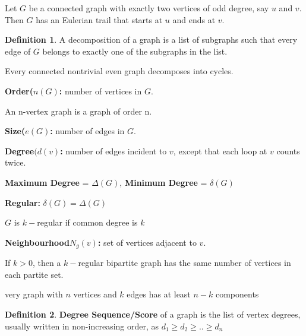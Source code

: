 \documentclass{article}
\theoremstyle{definition}
\newtheorem*{defi}{Definition}
\theoremstyle{definition}
\newenvironment{manualprop}[1]{%
  \renewcommand\themanualpropinner{#1}%
  \manualpropinner
}{\endmanualpropinner}
\newenvironment{manualcoro}[1]{%
  \renewcommand\themanualcoroinner{#1}%
  \manualcoroinner
}{\endmanualcoroinner}
\theoremstyle{named}
\begin{document}
\begin{manualcoro}{6.1}
    Let $G$ be a connected graph with exactly two vertices of odd
degree, say $u$ and $v$. Then $G$ has an Eulerian trail that starts at $u$ and ends
at $v$.
\end{manualcoro}

\begin{defi}
    A decomposition of a graph is a list of subgraphs such that every
edge of $G$ belongs to exactly one of the subgraphs in the list.
\end{defi}


\begin{manualcoro}{6.2}
Every connected nontrivial even graph decomposes into cycles.
\end{manualcoro}


\begin{compactitem}
    \item \textbf{Order($n(G)$:} number of vertices in $G$.
    \item An n-vertex graph is a graph of order n.
    \item \textbf{Size($e(G)$:} number of edges in $G$.
    \item \textbf{Degree$(d(v)$:} number of edges incident to $v$, except that each loop at $v$ counts twice.
    \item \textbf{Maximum Degree} = $\Delta(G)$, \textbf{Minimum Degree} = $\delta(G)$
    \item \textbf{Regular:} $\delta(G) = \Delta(G)$
    \item $G$ is $k-$regular if common degree is $k$
    \item \textbf{Neighbourhood$N_g (v)$:} set of vertices adjacent to $v$.
\end{compactitem}

\begin{manualprop}{34}
    If $k > 0$, then a $k-$regular bipartite graph has the same
number of vertices in each partite set.
\end{manualprop}

\begin{manualprop}
    Every graph with $n$ vertices and $k$
edges has at least $n-k$ components
\end{manualprop}

\begin{defi}
    \textbf{Degree Sequence/Score} of a graph is the list of vertex
degrees, usually written in non-increasing order, as $d_1 \geq d_2 \geq .. \geq d_n$
\end{defi}
\end{document}

